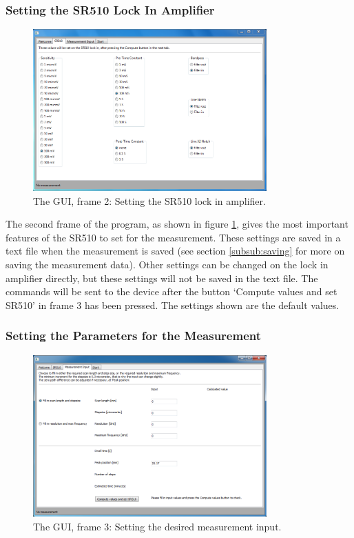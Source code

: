 \subsubsection{Setting the SR510 Lock In Amplifier}\label{subsub:lockin}

\begin{figure}[!ht]
 \begin{center}
  \includegraphics[width=0.8\textwidth]{figures/gui2}
  \caption{The GUI, frame 2: Setting the SR510 lock in amplifier.}
  \label{fig:gui2}
 \end{center}
\end{figure}

The second frame of the program, as shown in figure \ref{fig:gui2}, gives the most important features of the SR510 to set for the measurement. These settings are saved in a text file when the measurement is saved (see section \ref{subsub:saving} for more on saving the measurement data). Other settings can be changed on the lock in amplifier directly, but these settings will not be saved in the text file. The commands will be sent to the device after the button `Compute values and set SR510' in frame 3 has been pressed. The settings shown are the default values.

\subsubsection{Setting the Parameters for the Measurement}

\begin{figure}[!ht]
 \begin{center}
  \includegraphics[width=0.8\textwidth]{figures/gui3}
  \caption{The GUI, frame 3: Setting the desired measurement input.}
  \label{fig:gui3}
 \end{center}
\end{figure}


